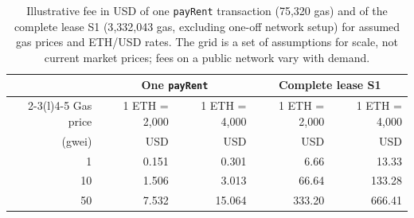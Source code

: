 \begin{table}[t]
\centering
\small
\caption{Illustrative fee in USD of one \texttt{payRent} transaction (75{,}320 gas) and of the complete lease S1 (3{,}332{,}043 gas, excluding one-off network setup) for assumed gas prices and ETH/USD rates. The grid is a set of assumptions for scale, not current market prices; fees on a public network vary with demand.}
\label{tab:fee}
\begin{tabular}{@{}rrrrr@{}}
\toprule
 & \multicolumn{2}{c}{One \texttt{payRent}} & \multicolumn{2}{c}{Complete lease S1} \\
\cmidrule(lr){2-3}\cmidrule(l){4-5}
Gas price & 1 ETH = 2{,}000 & 1 ETH = 4{,}000 & 1 ETH = 2{,}000 & 1 ETH = 4{,}000 \\
(gwei) & USD & USD & USD & USD \\
\midrule
1 & 0.151 & 0.301 & 6.66 & 13.33 \\
10 & 1.506 & 3.013 & 66.64 & 133.28 \\
50 & 7.532 & 15.064 & 333.20 & 666.41 \\
\bottomrule
\end{tabular}
\end{table}
